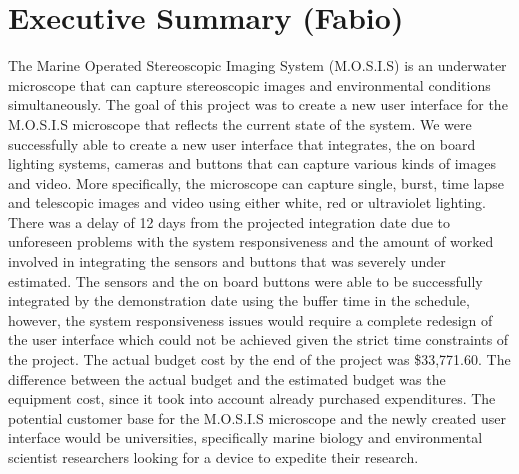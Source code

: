 \section*{Executive Summary (Fabio)}
\begin{spacing}{1.5}
The Marine Operated Stereoscopic Imaging System (M.O.S.I.S) is an underwater microscope that can capture stereoscopic images and environmental conditions simultaneously. The goal of this project was to create a new user interface for the M.O.S.I.S microscope that reflects the current state of the system. We were successfully able to create a new user interface that integrates, the on board lighting systems, cameras and buttons that can capture various kinds of images and video. More specifically, the microscope can capture single, burst, time lapse and telescopic images and video using either white, red or ultraviolet lighting. There was a delay of 12 days from the projected integration date due to unforeseen problems with the system responsiveness and the amount of worked involved in integrating the sensors and buttons that was severely under estimated. The sensors and the on board buttons were able to be successfully integrated by the demonstration date using the buffer time in the schedule, however, the system responsiveness issues would require a complete redesign of the user interface which could not be achieved given the strict time constraints of the project. The actual budget cost by the end of the project was \$33,771.60. The difference between the actual budget and the estimated budget was the equipment cost, since it took into account already purchased expenditures. The potential customer base for the M.O.S.I.S microscope and the newly created user interface would be universities, specifically marine biology and environmental scientist researchers looking for a device to expedite their research.
\end{spacing}